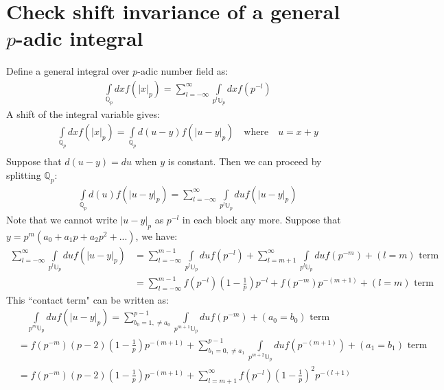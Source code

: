 \documentclass[12pt]{article}
\begin{document}
\section{Check shift invariance of a general $p$-adic integral}
Define a general integral over $p$-adic number field as:
\begin{equation}
\begin{aligned}
&\quad \int\limits_{\mathbb{Q}_p} dx f(|x|_p)=\sum\limits_{l=-\infty}^{\infty}\int\limits_{p^l\mathbb{U}_p}dx f(p^{-l})
\end{aligned}
\end{equation}
A shift of the integral variable gives:
\begin{equation}
\begin{aligned}
&\quad \int\limits_{\mathbb{Q}_p} dx f(|x|_p)=\int\limits_{\mathbb{Q}_p} d(u-y) f(|u-y|_p) \quad\text{where}\quad u=x+y \\
\end{aligned}
\end{equation}
Suppose that $d(u-y)=du$ when $y$ is constant. Then we can proceed by splitting $\mathbb{Q}_p$:
\begin{equation}
\begin{aligned}
&\quad \int\limits_{\mathbb{Q}_p} d(u) f(|u-y|_p)=\sum\limits_{l=-\infty}^{\infty}\int\limits_{p^l\mathbb{U}_p}du f(|u-y|_p)
\end{aligned}
\end{equation}
Note that we cannot write $|u-y|_p$ as $p^{-l}$ in each block any more. Suppose that $y=p^m(a_0+a_1 p+a_2 p^2+...)$, we have:
\begin{equation}
\begin{aligned}
\sum\limits_{l=-\infty}^{\infty}\int\limits_{p^l\mathbb{U}_p}du f(|u-y|_p)&=\sum\limits_{l=-\infty}^{m-1}\int\limits_{p^l\mathbb{U}_p}du f(p^{-l})+\sum\limits_{l=m+1}^{\infty}\int\limits_{p^l\mathbb{U}_p}du f(p^{-m})+(l=m)\text{ term}\\
&=\sum\limits_{l=-\infty}^{m-1}f(p^{-l})(1-\frac{1}{p})p^{-l}+f(p^{-m})p^{-(m+1)}+(l=m)\text{ term}
\end{aligned}
\end{equation}
This ``contact term" can be written as:
\begin{equation}
\begin{aligned}
&\quad\int\limits_{p^m\mathbb{U}_p}du f(|u-y|_p)=\sum\limits_{b_0=1,\neq a_0}^{p-1}\int\limits_{p^{m+1}\mathbb{U}_p}du f(p^{-m})+(a_0=b_0)\text{ term}\\
&=f(p^{-m})(p-2)(1-\frac{1}{p})p^{-(m+1)}+\sum\limits_{b_1=0,\neq a_1}^{p-1}\int\limits_{p^{m+2}\mathbb{U}_p}du f(p^{-(m+1)})+(a_1=b_1)\text{ term}\\
&=f(p^{-m})(p-2)(1-\frac{1}{p})p^{-(m+1)}+\sum\limits_{l=m+1}^{\infty}f(p^{-l})(1-\frac{1}{p})^2 p^{-(l+1)}
\end{aligned}
\end{equation}
\end{document}
